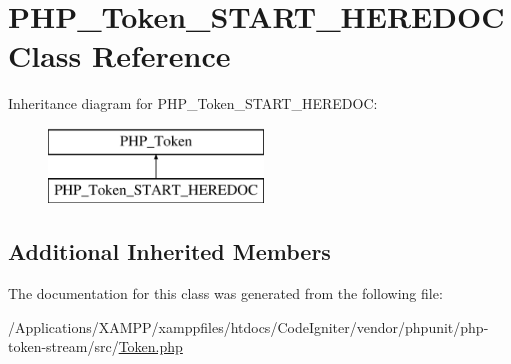 \hypertarget{class_p_h_p___token___s_t_a_r_t___h_e_r_e_d_o_c}{}\section{P\+H\+P\+\_\+\+Token\+\_\+\+S\+T\+A\+R\+T\+\_\+\+H\+E\+R\+E\+D\+OC Class Reference}
\label{class_p_h_p___token___s_t_a_r_t___h_e_r_e_d_o_c}
Inheritance diagram for P\+H\+P\+\_\+\+Token\+\_\+\+S\+T\+A\+R\+T\+\_\+\+H\+E\+R\+E\+D\+OC\+:\begin{figure}[H]
\begin{center}
\leavevmode
\includegraphics[height=2.000000cm]{class_p_h_p___token___s_t_a_r_t___h_e_r_e_d_o_c}
\end{center}
\end{figure}
\subsection*{Additional Inherited Members}


The documentation for this class was generated from the following file\+:\begin{DoxyCompactItemize}
\item 
/\+Applications/\+X\+A\+M\+P\+P/xamppfiles/htdocs/\+Code\+Igniter/vendor/phpunit/php-\/token-\/stream/src/\mbox{\hyperlink{_token_8php}{Token.\+php}}\end{DoxyCompactItemize}
